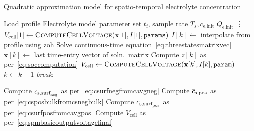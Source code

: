 
\begin{algorithm}[!htbp]
    \caption{Quadratic approximation model for spatio-temporal electrolyte concentration}\label{alg:quadraticce}
    \begin{algorithmic}[1]
        \Require Load profile 
        \Require Electrolyte model parameter set  
        \Userdata $ t_\text{f}$,  sample rate $T_s, c_\text{e,init}$
            \State $Q_\text{e,init}$
            \State \vdots
            \State
            \State
            \State
            \State $V_\text{cell}[1] \gets \textsc{ComputeCellVoltage}(\textbf{x}[1],I[1],\texttt{params})$ 
                \State $I[k] \gets $ interpolate from profile using \gls{zoh}
                \State Solve continuous-time equation~\cref{eq:threestatesmatrixvec} 
                \State $\mathbf{x}[k] \gets $ last time-entry  vector of soln.\  matrix 
                \State Compute $z[k]$ as per~\cref{eq:soccomputation}
                \State $V_\text{cell} \gets \textsc{ComputeCellVoltage}(\textbf{x}[k],I[k],\texttt{param}) $
                    \State $k \gets k - 1$ 
                    \State \textit{break};
                \EndIf
            \EndFor
        \EndFunction

            \State Compute $c_{{\text{s,surf}_\text{neg}}}$ as per~\cref{eq:csurfnegfromcavgneg}
            \State Compute $\overline{c}_{\text{s,pos}}$ as per~\cref{eq:csposbulkfromcsnegbulk}
            \State Compute $c_{{\text{s,surf}_\text{pos}}}$ as per~\cref{eq:csurfposfromcavgpos}
            \State Compute $V_\text{cell}$ as per~\cref{eq:spmbasicoutputvoltagefinal}
        \EndOutputEqn%
    \end{algorithmic}
\end{algorithm}
